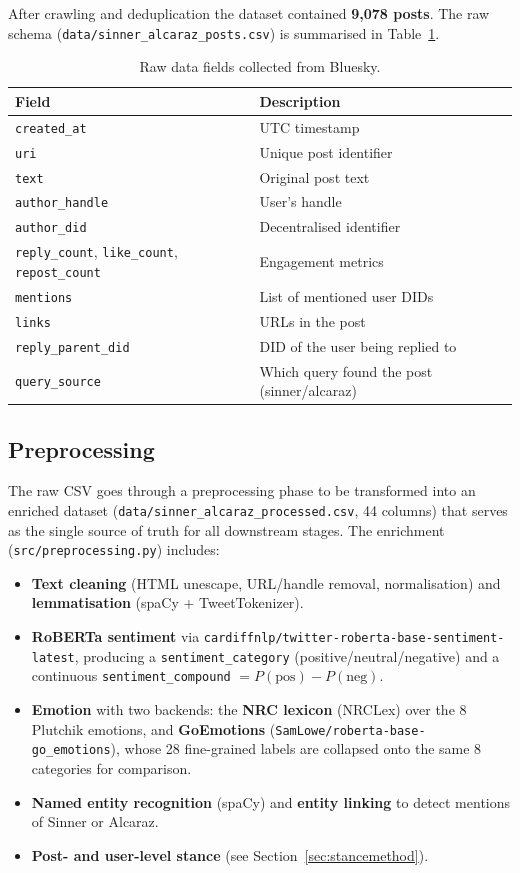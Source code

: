 \documentclass[12pt,a4paper]{article}
\begin{document}
After crawling and deduplication the dataset contained \textbf{9{,}078 posts}. The raw schema
(\texttt{data/sinner\_alcaraz\_posts.csv}) is summarised in Table~\ref{tab:rawfields}.

\begin{table}[H]
\centering
\begin{tabular}{ll}
\toprule
Field & Description \\
\midrule
\texttt{created\_at} & UTC timestamp \\
\texttt{uri} & Unique post identifier \\
\texttt{text} & Original post text \\
\texttt{author\_handle} & User's handle \\
\texttt{author\_did} & Decentralised identifier \\
\texttt{reply\_count}, \texttt{like\_count}, \texttt{repost\_count} & Engagement metrics \\
\texttt{mentions} & List of mentioned user DIDs \\
\texttt{links} & URLs in the post \\
\texttt{reply\_parent\_did} & DID of the user being replied to \\
\texttt{query\_source} & Which query found the post (sinner/alcaraz) \\
\bottomrule
\end{tabular}
\caption{Raw data fields collected from Bluesky.}
\label{tab:rawfields}
\end{table}

\subsection{Preprocessing}

The raw CSV goes through a preprocessing phase to be transformed into an enriched dataset
(\texttt{data/sinner\_alcaraz\_processed.csv}, 44 columns) that serves as the single source of
truth for all downstream stages. The enrichment (\texttt{src/preprocessing.py}) includes:

\begin{itemize}
    \item \textbf{Text cleaning} (HTML unescape, URL/handle removal, normalisation) and
    \textbf{lemmatisation} (spaCy + TweetTokenizer).
    \item \textbf{RoBERTa sentiment} via
    \texttt{cardiffnlp/twitter-roberta-base-sentiment-latest}, producing a
    \texttt{sentiment\_category} (positive/neutral/negative) and a continuous
    \texttt{sentiment\_compound} $= P(\text{pos}) - P(\text{neg})$.
    \item \textbf{Emotion} with two backends: the \textbf{NRC lexicon} (NRCLex) over the 8
    Plutchik emotions, and \textbf{GoEmotions} (\texttt{SamLowe/roberta-base-go\_emotions}),
    whose 28 fine-grained labels are collapsed onto the same 8 categories for comparison.
    \item \textbf{Named entity recognition} (spaCy) and \textbf{entity linking} to detect
    mentions of Sinner or Alcaraz.
    \item \textbf{Post- and user-level stance} (see Section~\ref{sec:stancemethod}).
\end{itemize}
\end{document}
